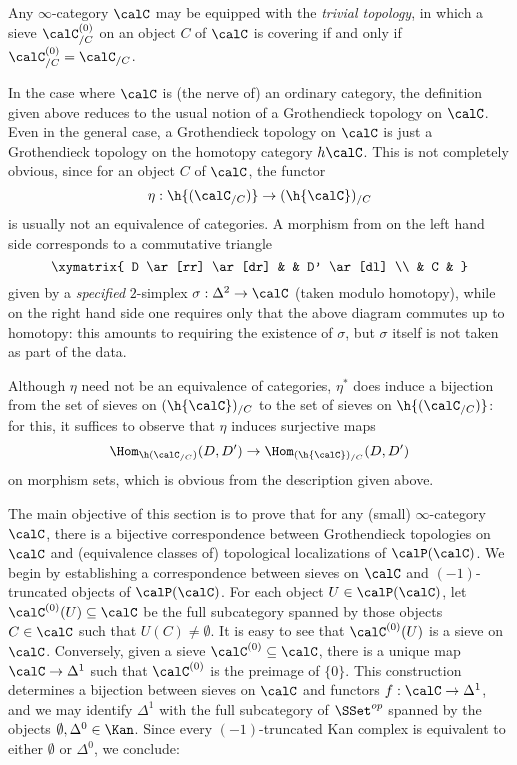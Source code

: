 \begin{example}\label{trivvtop}
Any $\infty$-category $\calC$ may be equipped with the {\it trivial topology}, in which a sieve
$\calC^{(0)}_{/C}$ on an object $C$ of $\calC$ is covering if and only if $\calC^{(0)}_{/C} = \calC_{/C}$.
\end{example}

\begin{remark}
In the case where $\calC$ is (the nerve of) an ordinary category, the definition given above reduces to the usual notion of a Grothendieck topology on $\calC$. Even in the general case, a Grothendieck
topology on $\calC$ is just a Grothendieck topology on the homotopy category $h \calC$.
This is not completely obvious, since for an object $C$ of $\calC$, the functor
$$ \eta: \h{(\calC_{/C})} \rightarrow (\h{\calC})_{/C}$$ is usually not an equivalence of categories.
A morphism from on the left hand side corresponds to a commutative triangle
$$ \xymatrix{ D \ar[rr] \ar[dr] & & D' \ar[dl] \\
& C & }$$ given by a {\it specified} $2$-simplex $\sigma: \Delta^2 \rightarrow \calC$ (taken modulo homotopy), while on the right hand side one requires only that the above diagram commutes up to homotopy: this amounts to requiring the existence of $\sigma$, but $\sigma$ itself is not taken as part of the data.

Although $\eta$ need not be an equivalence of categories, $\eta^{\ast}$ does induce
a bijection from the set of sieves on $(\h{\calC})_{/C}$ to the set of sieves on $\h{(\calC_{/C})}$: for this, it suffices to observe that $\eta$ induces surjective maps
$$ \Hom_{\h(\calC_{/C})} (D,D') \rightarrow \Hom_{ (\h{\calC})_{/C} }(D,D')$$
on morphism sets, which is obvious from the description given above.
\end{remark}

The main objective of this section is to prove that for any (small) $\infty$-category $\calC$, there is a bijective correspondence between Grothendieck topologies on $\calC$ and (equivalence classes of) topological localizations of $\calP(\calC)$. We begin by establishing a correspondence between sieves on $\calC$ and $(-1)$-truncated objects of $\calP(\calC)$. 
For each object $U \in \calP(\calC)$, let $\calC^{(0)}(U) \subseteq \calC$ be the full subcategory spanned by those objects $C \in \calC$ such that $U(C) \neq \emptyset$. It is easy to see that
$\calC^{(0)}(U)$ is a sieve on $\calC$. Conversely, given a sieve $\calC^{(0)} \subseteq \calC$, there is a unique map $\calC \rightarrow \Delta^1$ such that $\calC^{(0)}$ is the preimage of
$\{0\}$. This construction determines a bijection between sieves on $\calC$ and functors
$f: \calC \rightarrow \Delta^1$, and we may identify $\Delta^1$ with the full subcategory of
$\SSet^{op}$ spanned by the objects $\emptyset, \Delta^0 \in \Kan$. Since every $(-1)$-truncated Kan complex is equivalent to either $\emptyset$ or $\Delta^0$, we conclude:

